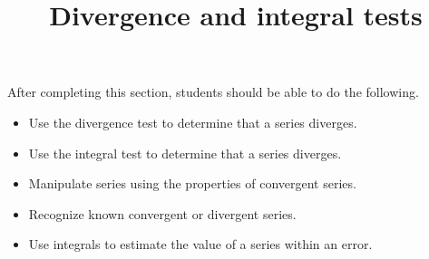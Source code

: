\documentclass{ximera}
\title{Divergence and integral tests}
\begin{document}
\begin{abstract}
\end{abstract}

\maketitle

\begin{sectionOutcomes}

After completing this section, students should be able to do the following.

\begin{itemize}
\item Use the divergence test to determine that a series diverges.
\item Use the integral test to  determine that a series diverges.
\item Manipulate series using the properties of convergent series.
\item Recognize known convergent or divergent series.
\item Use integrals to estimate the value of a series within an error.
\end{itemize}

\end{sectionOutcomes}
\end{document}
